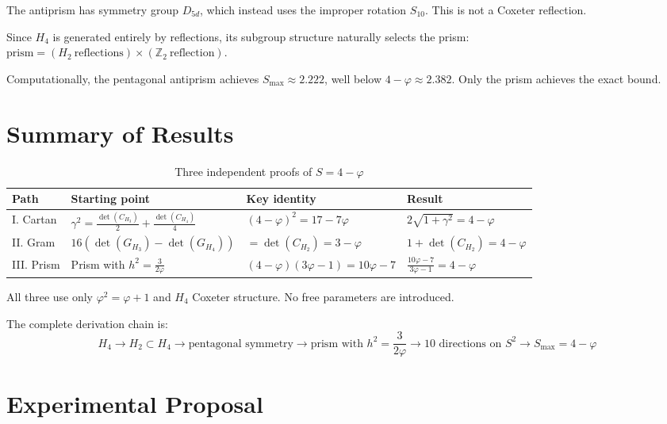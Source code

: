 \documentclass[12pt,a4paper]{article}
\newcommand{\vp}{\varphi}
\newcommand{\Smax}{S_{\max}}
\newcommand{\detG}[1]{\det(G_{#1})}
\newcommand{\detC}[1]{\det(C_{#1})}
\begin{document}
The antiprism has symmetry group $D_{5d}$, which instead uses the 
improper rotation $S_{10}$. This is not a Coxeter reflection.

Since $H_4$ is generated entirely by reflections, its subgroup 
structure naturally selects the prism: $\mathrm{prism} = (H_2\ \mathrm{reflections}) \times (\mathbb{Z}_2\ \mathrm{reflection})$.

Computationally, the pentagonal antiprism achieves $\Smax \approx 2.222$, 
well below $4 - \vp \approx 2.382$. Only the prism achieves the exact bound.

\section{Summary of Results}
\label{sec:summary_paths}

\begin{table}[H]
\centering
\caption{Three independent proofs of $S = 4 - \vp$}
\label{tab:three_proofs}
\begin{tabular}{@{}llll@{}}
\toprule
\textbf{Path} & \textbf{Starting point} & \textbf{Key identity} & \textbf{Result} \\
\midrule
I. Cartan & $\gamma^2 = \frac{\detC{H_3}}{2} + \frac{\detC{H_4}}{4}$ 
          & $(4-\vp)^2 = 17-7\vp$ & $2\sqrt{1+\gamma^2} = 4-\vp$ \\[6pt]
II. Gram  & $16(\detG{H_3} - \detG{H_4})$ 
          & $= \detC{H_2} = 3-\vp$ & $1 + \detC{H_2} = 4-\vp$ \\[6pt]
III. Prism & Prism with $h^2 = \frac{3}{2\vp}$ 
           & $(4-\vp)(3\vp-1) = 10\vp-7$ & $\frac{10\vp-7}{3\vp-1} = 4-\vp$ \\
\bottomrule
\end{tabular}
\end{table}

All three use only $\vp^2 = \vp + 1$ and $H_4$ Coxeter structure. 
No free parameters are introduced.

\noindent The complete derivation chain is:
\begin{equation*}
H_4 \to H_2 \subset H_4 \to \text{pentagonal symmetry} \to \text{prism with } h^2 = \frac{3}{2\vp} \to 10 \text{ directions on } S^2 \to \Smax = 4 - \vp
\end{equation*}

\section{Experimental Proposal}
\label{sec:experiment}
\end{document}
